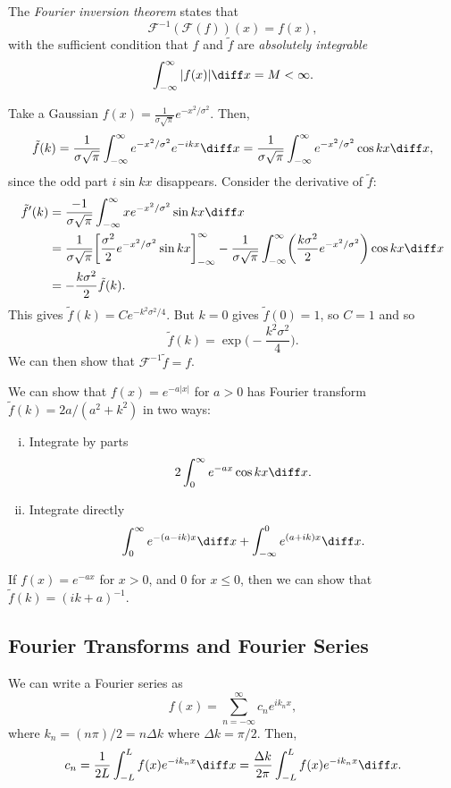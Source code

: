 \documentclass[12pt]{article}
\begin{document}
The \textit{Fourier inversion theorem} states that
\[
	\mathcal{F}^{-1}(\mathcal{F}(f))(x) = f(x)
,\]
with the sufficient condition that $f$ and $\tilde f$ are \textit{absolutely integrable}
\[
	\int_{-\infty}^{\infty}|f(x)| \diff x = M < \infty
.\]

\begin{exbox}
	Take a Gaussian $f(x) = \frac{1}{\sigma \sqrt \pi} e^{-x^2/\sigma^2}$. Then,
	\[
		\tilde f(k) = \frac{1}{\sigma \sqrt \pi} \int_{-\infty}^{\infty} e^{-x^2/\sigma^2}e^{-ikx} \diff x = \frac{1}{\sigma \sqrt \pi} \int_{-\infty}^{\infty} e^{-x^2/\sigma^2} \cos kx \diff x
	,\]
	since the odd part $i \sin kx$ disappears. Consider the derivative of $\tilde f$:
	\begin{align*}
		\tilde f'(k) &= \frac{-1}{\sigma \sqrt \pi} \int_{-\infty}^{\infty} x e^{-x^2/\sigma^2} \sin kx \diff x \\
			     &= \frac{1}{\sigma \sqrt \pi} \biggl[ \frac{\sigma^2}{2} e^{-x^2/\sigma^2} \sin kx \biggr]_{-\infty}^{\infty} - \frac{1}{\sigma \sqrt \pi} \int_{-\infty}^{\infty} \biggl( \frac{k \sigma^2}{2} e^{-x^2/\sigma^2}\biggr) \cos kx \diff x \\
			     &= - \frac{k \sigma^2}{2} \tilde f(k).
	\end{align*}
	This gives $\tilde f(k) = C e^{- k^2 \sigma^2/4}$. But $k = 0$ gives $\tilde f (0) = 1$, so $C = 1$ and so
	\[
		\tilde f(k) = \exp \biggl( - \frac{k^2\sigma^2}{4} \biggr)
	.\]
	We can then show that $\mathcal{F}^{-1} \tilde f = f$.
\end{exbox}

\begin{exbox}
	We can show that $f(x) = e^{-a|x|}$ for $a > 0$ has Fourier transform $\tilde f(k) = 2a/(a^2 + k^2)$ in two ways:
	\begin{enumerate}[(i)]
		\item Integrate by parts
			\[
			2 \int_{0}^{\infty} e^{-ax} \cos k x \diff x
			.\]
		\item Integrate directly
			\[
				\int_{0}^{\infty} e^{-(a-ik)x}\diff x + \int_{-\infty}^{0}e^{(a + ik)x}\diff x
			.\]
	\end{enumerate}
	If $f(x)=  e^{-ax}$ for $x > 0$, and $0$ for $x \leq 0$, then we can show that $\tilde f(k) = (ik+a)^{-1}$.
\end{exbox}

\subsection{Fourier Transforms and Fourier Series}%
\label{sub:fourier_transforms_and_fourier_series}

We can write a Fourier series as
\[
	f(x) = \sum_{n = -\infty}^{\infty} c_n e^{i k_n x}
,\]
where $k_n = (n\pi)/2 = n \Delta k$ where $\Delta k = \pi/2$. Then,
\[
	c_n = \frac{1}{2L} \int_{-L}^{L} f(x) e^{-ik_n x}\diff x = \frac{\Delta k}{2 \pi} \int_{-L}^{L} f(x) e^{-ik_nx}\diff x
.\]

\newpage

\printindex
\end{document}
